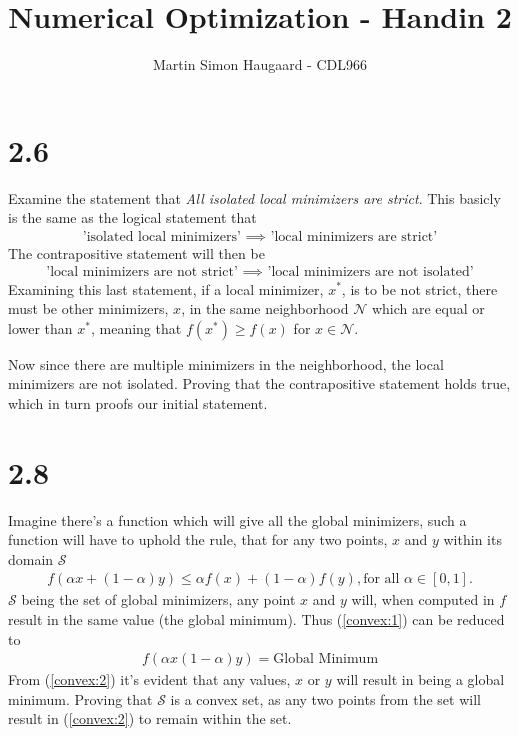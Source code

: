 \documentclass[11pt]{article} %
\title{Numerical Optimization - Handin 2}
\author{Martin Simon Haugaard - CDL966}
\begin{document}
\maketitle
\section*{2.6}
Examine the statement that \textit{All isolated local minimizers are strict}. This basicly is the same as the logical statement that
\begin{gather*}
\text{'isolated local minimizers' $\implies$ 'local minimizers are strict'}
\end{gather*}
The contrapositive statement will then be
\begin{gather*}
\text{'local minimizers are not strict' $\implies$ 'local minimizers are not isolated'}
\end{gather*}
Examining this last statement, if a local minimizer, $x^*$, is to be not strict, there must be other minimizers, $x$, in the same neighborhood $\mathcal{N}$ which are equal or lower than $x^*$, meaning that $f(x^*) \geq f(x)$ for $x \in \mathcal{N}$.

Now since there are multiple minimizers in the neighborhood, the local minimizers are not isolated. Proving that the contrapositive statement holds true, which in turn proofs our initial statement.

\section*{2.8}
Imagine there's a function which will give all the global minimizers, such a function will have to uphold the rule, that for any two points, $x$ and $y$ within its domain $\mathcal{S}$
\begin{gather}
\label{convex:1}
f(\alpha x + (1 - \alpha) y ) \leq \alpha f(x)  + (1 - \alpha) f(y), \text{for all  } \alpha \in [0, 1].
\end{gather}
$\mathcal{S}$ being the set of global minimizers, any point $x$ and $y$ will, when computed in $f$ result in the same value (the global minimum). Thus (\ref{convex:1}) can be reduced to
\begin{gather}
\label{convex:2}
f(\alpha x(1-\alpha)y) = \text{Global Minimum}
\end{gather}
From (\ref{convex:2}) it's evident that any values, $x$ or $y$ will result in being a global minimum. Proving that $\mathcal{S}$ is a convex set,  as any two points from the set will result in (\ref{convex:2}) to remain within the set.
\end{document}

